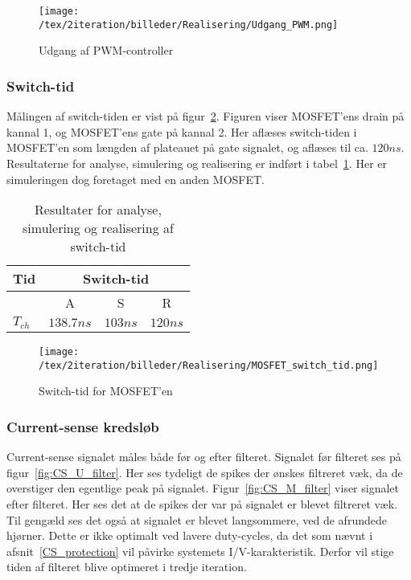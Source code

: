 \begin{figure}[H]
	\center
	\texttt{[image: /tex/2iteration/billeder/Realisering/Udgang\_PWM.png]}
	\caption{Udgang af PWM-controller}
	\label{fig:Udgang_PWM}
\end{figure} 

\subsubsection{Switch-tid}
Målingen af switch-tiden er vist på figur~\ref{fig:Realisering_MOSFET_switch_tid_2}. Figuren viser MOSFET'ens drain på kannal 1, og MOSFET'ens gate på kannal 2. Her aflæses switch-tiden i MOSFET'en som længden af plateauet på gate signalet, og aflæses til ca. $120ns$. Resultaterne for analyse, simulering og realisering er indført i tabel~\ref{tab:resultat_switch_tid_2}. Her er simuleringen dog foretaget med en anden MOSFET.

\begin{table}[H] 			
	\centering
	\begin{tabularx}{\textwidth}{|X|c|c|c|}
		\hline
		\textbf{Tid} & \multicolumn{3}{|c|}{\textbf{Switch-tid}} 										\\ \hline
		& A & S & R 									\\ \hline
		$T_{ch}$ & $138.7ns$ & $103ns$ & $120ns$ 									\\ \hline 
		
	\end{tabularx}
	\caption{Resultater for analyse, simulering og realisering af switch-tid}
	\label{tab:resultat_switch_tid_2}
\end{table}

 
\begin{figure}[H]
	\center
	\texttt{[image: /tex/2iteration/billeder/Realisering/MOSFET\_switch\_tid.png]}
	\caption{Switch-tid for MOSFET'en}
	\label{fig:Realisering_MOSFET_switch_tid_2}
\end{figure} 


\subsubsection{Current-sense kredsløb}
Current-sense signalet måles både før og efter filteret. Signalet før filteret ses på figur~\ref{fig:CS_U_filter}. Her ses tydeligt de spikes der ønskes filtreret væk, da de overstiger den egentlige peak på signalet. Figur~\ref{fig:CS_M_filter} viser signalet efter filteret. Her ses det at de spikes der var på signalet er blevet filtreret væk. Til gengæld ses det også at signalet er blevet langsommere, ved de afrundede hjørner. Dette er ikke optimalt ved lavere duty-cycles, da det som nævnt i afsnit~\ref{CS_protection} vil påvirke systemets I/V-karakteristik. Derfor vil stige tiden af filteret blive optimeret i tredje iteration. 

